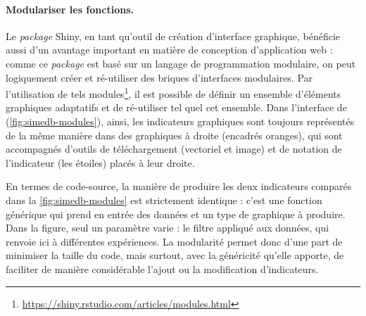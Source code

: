 \paragraph{Modulariser les fonctions.}

Le \textit{package} \textsf{Shiny}, en tant qu'outil de création d'interface graphique, bénéficie aussi d'un avantage important en matière de conception d'application web : comme ce \textit{package} est basé sur un langage de programmation modulaire, on peut logiquement créer et ré-utiliser des \og briques d'interfaces\fg{} modulaires.
Par l'utilisation de tels modules\footnote{
	\href{https://shiny.rstudio.com/articles/modules.html}{https://shiny.rstudio.com/articles/modules.html}
}, il est possible de définir un ensemble d'éléments graphiques adaptatifs et de ré-utiliser tel quel cet ensemble.
Dans l'interface de \simedb{} (\cref{fig:simedb-modules}), ainsi, les indicateurs graphiques sont toujours représentés de la même manière dans des graphiques à droite (encadrés oranges), qui sont accompagnés d'outils de téléchargement (vectoriel et image) et de notation de l'indicateur (les étoiles) placés à leur droite.

En termes de code-source, la manière de produire les deux indicateurs comparés dans la \cref{fig:simedb-modules} est strictement identique : c'est une fonction générique qui prend en entrée des données et un type de graphique à produire.
Dans la figure, seul un paramètre varie : le filtre appliqué aux données, qui renvoie ici à différentes expériences.
La modularité permet donc d'une part de minimiser la taille du code, mais surtout, avec la généricité qu'elle apporte, de faciliter de manière considérable l'ajout ou la modification d'indicateurs.


